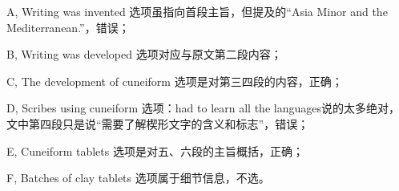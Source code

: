 \begin{blk}
\begin{nlz}
        A, Writing was invented 选项虽指向首段主旨，但提及的“Asia Minor and the Mediterranean.”，错误；

        B, Writing was developed 选项对应与原文第二段内容；

        C, The development of cuneiform 选项是对第三四段的内容，正确；

        D, Scribes using cuneiform 选项：had to learn all the languages说的太多绝对，文中第四段只是说“需要了解楔形文字的含义和标志”，错误；

        E, Cuneiform tablets 选项是对五、六段的主旨概括，正确；

        F, Batches of clay tablets 选项属于细节信息，不选。
    \end{nlz}
\end{blk}
